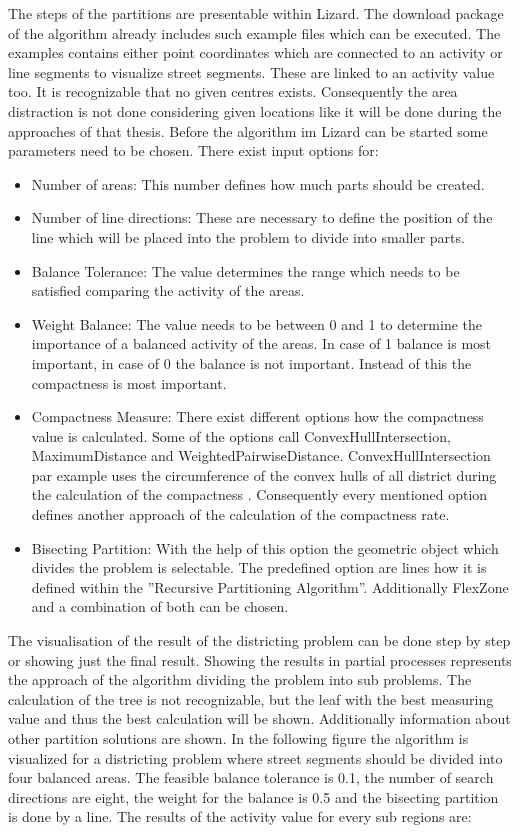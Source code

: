The steps of the partitions are presentable within Lizard. The download package of the algorithm already includes such example files which can be executed. The examples contains either point coordinates which are connected to an activity or line segments to visualize street segments. These are linked to an activity value too. It is recognizable that no given centres exists. Consequently the area distraction is not done considering given locations like it will be done during the approaches of that thesis. Before the algorithm im Lizard can be started some parameters need to be chosen. There exist input options for:
\begin{itemize}
	\item Number of areas: This number defines how much parts should be created.
	\item Number of line directions: These are necessary to define the position of the line which will be placed into the problem to divide into smaller parts.
	\item Balance Tolerance: The value determines the range which needs to be satisfied comparing the activity of the areas.
	\item Weight Balance: The value needs to be between 0 and 1 to determine the importance of a balanced activity of the areas. In case of 1 balance is most important, in case of 0 the balance is not important. Instead of this the compactness is most important.
	\item Compactness Measure: There exist different options how the compactness value is calculated. Some of the options call ConvexHullIntersection, MaximumDistance and WeightedPairwiseDistance. ConvexHullIntersection par example uses the circumference of the convex hulls of all district during the calculation of the compactness \cite{kit_lizard}. Consequently every mentioned option defines another approach of the calculation of the compactness rate.
	\item Bisecting Partition: With the help of this option the geometric object which divides the problem is selectable. The predefined option are lines how it is defined within the ''Recursive Partitioning Algorithm''. Additionally FlexZone and a combination of both can be chosen.
\end{itemize}

The visualisation of the result of the districting problem can be done step by step or showing just the final result. Showing the results in partial processes represents the approach of the algorithm dividing the problem into sub problems. The calculation of the tree is not recognizable, but the leaf with the best measuring value and thus the best calculation will be shown. Additionally information about other partition solutions are shown. In the following figure the algorithm is visualized for a districting problem where street segments should be divided into four balanced areas. The feasible balance tolerance is 0.1, the number of search directions are eight, the weight for the balance is 0.5 and the bisecting partition is done by a line. The results of the activity value for every sub regions are:


